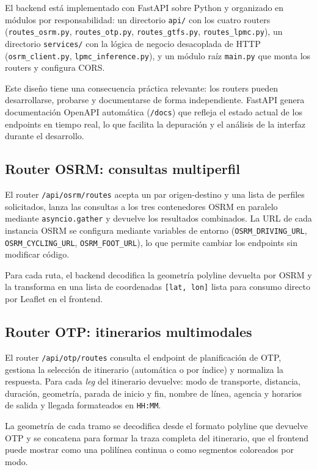 El backend está implementado con FastAPI sobre Python y organizado en módulos por responsabilidad: un directorio \texttt{api/} con los cuatro routers (\texttt{routes\_osrm.py}, \texttt{routes\_otp.py}, \texttt{routes\_gtfs.py}, \texttt{routes\_lpmc.py}), un directorio \texttt{services/} con la lógica de negocio desacoplada de HTTP (\texttt{osrm\_client.py}, \texttt{lpmc\_inference.py}), y un módulo raíz \texttt{main.py} que monta los routers y configura CORS.

Este diseño tiene una consecuencia práctica relevante: los routers pueden desarrollarse, probarse y documentarse de forma independiente. FastAPI genera documentación OpenAPI automática (\texttt{/docs}) que refleja el estado actual de los endpoints en tiempo real, lo que facilita la depuración y el análisis de la interfaz durante el desarrollo.

\subsection{Router OSRM: consultas multiperfil}

El router \texttt{/api/osrm/routes} acepta un par origen-destino y una lista de perfiles solicitados, lanza las consultas a los tres contenedores OSRM en paralelo mediante \texttt{asyncio.gather} y devuelve los resultados combinados. La URL de cada instancia OSRM se configura mediante variables de entorno (\texttt{OSRM\_DRIVING\_URL}, \texttt{OSRM\_CYCLING\_URL}, \texttt{OSRM\_FOOT\_URL}), lo que permite cambiar los endpoints sin modificar código.

Para cada ruta, el backend decodifica la geometría polyline devuelta por OSRM y la transforma en una lista de coordenadas \texttt{[lat, lon]} lista para consumo directo por Leaflet en el frontend.

\subsection{Router OTP: itinerarios multimodales}

El router \texttt{/api/otp/routes} consulta el endpoint de planificación de OTP, gestiona la selección de itinerario (automática o por índice) y normaliza la respuesta. Para cada \textit{leg} del itinerario devuelve: modo de transporte, distancia, duración, geometría, parada de inicio y fin, nombre de línea, agencia y horarios de salida y llegada formateados en \texttt{HH:MM}.

La geometría de cada tramo se decodifica desde el formato polyline que devuelve OTP y se concatena para formar la traza completa del itinerario, que el frontend puede mostrar como una polilínea continua o como segmentos coloreados por modo.

